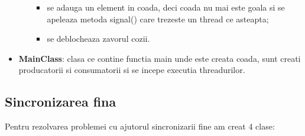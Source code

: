 \documentclass{article}
\begin{document}
\begin{itemize}
\begin{itemize}
\begin{itemize}
            \item se adauga un element in coada, deci coada nu mai este goala si se apeleaza metoda signal() care trezeste un thread ce asteapta;
            \item se deblocheaza zavorul cozii.
        \end{itemize}
    \end{itemize}
    \item \textbf{MainClass}: clasa ce contine functia main unde este creata coada, sunt creati producatorii si consumatorii si se incepe executia threadurilor.
\end{itemize}
\subsection{Sincronizarea fina}
Pentru rezolvarea problemei cu ajutorul sincronizarii fine am creat 4 clase:
\end{document}
